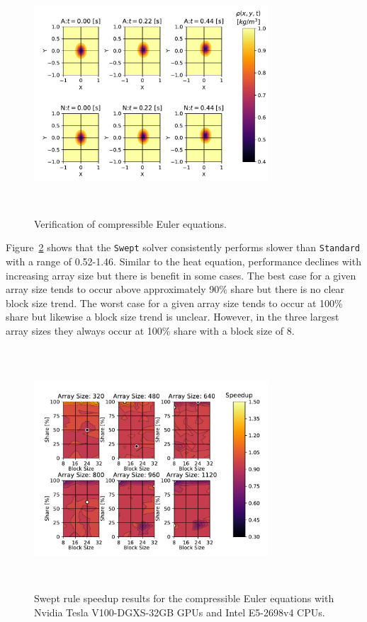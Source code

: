 \documentclass[preprints,article,accept,moreauthors,pdftex]{Definitions/mdpi}
\def\Swept{\texttt{Swept}}
\def\Standard{\texttt{Standard}}
\def\newCPU{Intel E5-2698v4} %
\def\newGPU{Nvidia Tesla V100-DGXS-32GB}
\begin{document}
\begin{figure}[htbp]
    \centering
    \includegraphics[height=9cm,width=0.78\textwidth, trim={0.75cm 0.3cm 0.2cm 0.2cm},clip]{figs/eulerValidate.pdf}
    \caption{Verification of compressible Euler equations.}
    \label{fig:eulerSurface}
\end{figure}

Figure~\ref{fig:newSpeedupEuler} shows that the \Swept{} solver consistently performs slower than \Standard{} with a range of 0.52-1.46. Similar to the heat equation, performance declines with increasing array size but there is benefit in some cases. The best case for a given array size tends to occur above approximately 90\% share but there is no clear block size trend. The worst case for a given array size tends to occur at 100\% share but likewise a block size trend is unclear. However, in the three largest array sizes they always occur at 100\% share with a block size of 8.


\begin{figure}[htbp]
    \centering
    \includegraphics[height=9cm,width=0.78\textwidth, trim={0.75cm 0.4cm 0.8cm 0.7cm},clip]{figs/speedUpeulerNew.pdf}
    \caption{Swept rule speedup results  for the compressible Euler equations with \newGPU{} GPUs and \newCPU{} CPUs.}
    \label{fig:newSpeedupEuler}
\end{figure}
\end{document}
